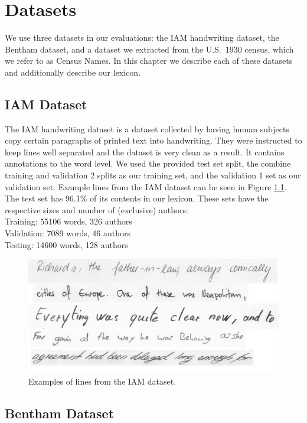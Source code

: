 \documentclass[ms,electronic,twosidetoc,letterpaper,chaptercenter,parttop,lof,lot]{byumsphd}
\begin{document}
\chapter{Datasets}\label{datasets}

We use three datasets in our evaluations: the IAM handwriting dataset, the Bentham dataset, and a dataset we extracted from the U.S.~1930 census, which we refer to as Census Names. In this chapter we describe each of these datasets and additionally describe our lexicon.

\section{IAM Dataset}

The IAM handwriting dataset \cite{IAM} is a dataset collected by having human subjects copy certain paragraphs of printed text into handwriting. They were instructed to keep lines well separated and the dataset is very clean as a result. It contains annotations to the word level. We used the provided test set split, the combine training and validation 2 splits as our training set, and the validation 1 set as our validation set.
Example lines from the IAM dataset can be seen in Figure \ref{fig:IAMExamples}.
The test set has 96.1\% of its contents in our lexicon.
These sets have the respective sizes and number of (exclusive) authors:\\
\indent \indent Training: 55106 words, 326 authors\\
\indent \indent Validation: 7089 words, 46 authors\\
\indent \indent Testing: 14600 words, 128 authors

\begin{figure}
    \centering
    \includegraphics[width=.9\textwidth]{IAM_examples}
    \caption{Examples of lines from the IAM dataset.}
    \label{fig:IAMExamples}
\end{figure}

\section{Bentham Dataset}
\end{document}
